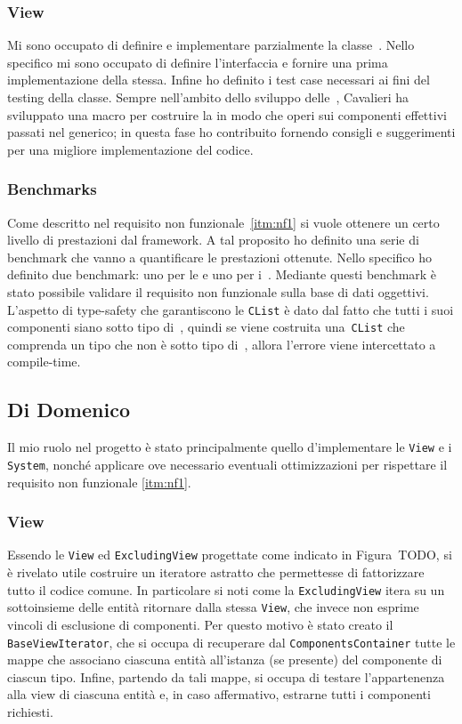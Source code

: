 \subsubsection{View}
Mi sono occupato di definire e implementare parzialmente la classe~\View.
Nello specifico mi sono occupato di definire l'interfaccia e fornire una prima implementazione della stessa.
Infine ho definito i test case necessari ai fini del testing della classe.
Sempre nell'ambito dello sviluppo delle~\View, Cavalieri ha sviluppato una macro per costruire la \View in modo che
operi sui componenti effettivi passati nel generico;
in questa fase ho contribuito fornendo consigli e suggerimenti per una migliore implementazione del codice.

\subsubsection{Benchmarks}
Come descritto nel requisito non funzionale~\ref{itm:nf1} si vuole ottenere un certo livello di prestazioni dal
framework.
A tal proposito ho definito una serie di benchmark che vanno a quantificare le prestazioni ottenute.
Nello specifico ho definito due benchmark: uno per le \View e uno per i~\System.
Mediante questi benchmark è stato possibile validare il requisito non funzionale sulla base di dati oggettivi.
L'aspetto di type-safety che garantiscono le \texttt{CList} è dato dal fatto che tutti i suoi componenti siano sotto tipo
di~\Component, quindi se viene costruita una~\texttt{CList} che comprenda un tipo che non è sotto tipo di~\Component,
allora l'errore viene intercettato a compile-time.

\subsection{Di Domenico}\label{subsec:nicolò-di-domenico}

Il mio ruolo nel progetto è stato principalmente quello d'implementare le \texttt{View} e i \texttt{System}, nonché
applicare ove necessario eventuali ottimizzazioni per rispettare il requisito non funzionale \ref{itm:nf1}.

\subsubsection{View}

Essendo le \texttt{View} ed \texttt{ExcludingView} progettate come indicato in Figura~TODO, si è rivelato utile costruire un
iteratore astratto che permettesse di fattorizzare tutto il codice comune.
In particolare si noti come la \texttt{ExcludingView} itera su un sottoinsieme delle entità ritornare dalla stessa
\texttt{View}, che invece non esprime vincoli di esclusione di componenti.
Per questo motivo è stato creato il \texttt{BaseViewIterator}, che si occupa di recuperare dal
\texttt{ComponentsContainer} tutte le mappe che associano ciascuna entità all'istanza (se presente) del componente di
ciascun tipo.
Infine, partendo da tali mappe, si occupa di testare l'appartenenza alla view di ciascuna entità e, in caso affermativo,
estrarne tutti i componenti richiesti.

